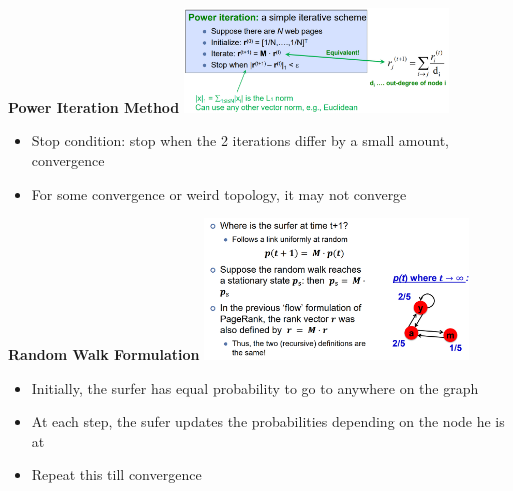 \documentclass[10pt, landscape]{article}
\begin{document}
\begin{multicols}{4}
\textbf{Power Iteration Method}
\includegraphics*[width=7cm]{power_iteration.png}
\begin{itemize}
  \item Stop condition: stop when the 2 iterations differ by a small amount, convergence
  \item For some convergence or weird topology, it may not converge 
\end{itemize}

\textbf{Random Walk Formulation}
\includegraphics*[width=7cm]{random_walk.png}
\begin{itemize}
  \item Initially, the surfer has equal probability to go to anywhere on the graph 
  \item At each step, the sufer updates the probabilities depending on the node he is at 
  \item Repeat this till convergence
\end{itemize}


\end{multicols}
\end{document}
